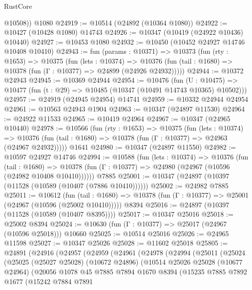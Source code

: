 \begin{lexlean}{RustCore}
\begin{coremodule}
        @10508))
    @1080
@24919 := @10514 (@24892 (@10364 @1080))
@24922 := @10427 (@10428 @1080) @14743
@24926 := @10347 (@10419 (@24922 @10436) @10440)
@24927 := @10453 @1080
@24932 := @10450 (@10452 @24927 @14746 @10408 @10410)
@24943 := fun (params : @10371) =>
  @10373
    (fun (rty : @1653) =>
    @10375
      (fun (lets : @10374) =>
      @10376 (fun (tail : @1680) => @10378 (fun (Γ : @10377) => @24899 (@24926 @24932)))))
@24944 := @10372 @24943
@24945 := @10369 @24944
@24954 := @10476
    (fun (U : @10475) => @10477 (fun (t : @29) => @10485 (@10347 (@10491 @14743 @10365) @10502)))
@24957 := @24919 (@24945 @24954) @14741
@24959 := @10332 @24944 @24954
@24961 := @10563 @24943 @1904
@24963 := @10347 (@24897 @11530)
@24964 := @24922 @11533
@24965 := @10419 @24964
@24967 := @10347 (@24965 @10440)
@24978 := @10566
    (fun (rty : @1653) =>
    @10375
      (fun (lets : @10374) =>
      @10376 (fun (tail : @1680) => @10378 (fun (Γ : @10377) => @24963 (@24967 @24932)))))
    @1641
@24980 := @10347 (@24897 @11550)
@24982 := @10597 @24927 @14746
@24994 := @10588
    (fun (lets : @10374) =>
    @10376
      (fun (tail : @1680) =>
      @10378 (fun (Γ : @10377) => @24980 (@24967 (@10596 (@24982 @10408 @10410))))))
    @7885
@25001 := @10347 (@24897 (@10397 (@11528 (@10589 (@10407 (@7886 @10410))))))
@25002 := @24982 @7885
@25011 := @10612
    (fun (tail : @1680) => @10378 (fun (Γ : @10377) => @25001 (@24967 (@10596 (@25002 @10410)))))
    @8394
@25016 := @24897 (@10397 (@11528 (@10589 (@10407 @8395))))
@25017 := @10347 @25016
@25018 := @25002 @8394
@25024 := @10630 (fun (Γ : @10377) => @25017 (@24967 (@10596 @25018))) @10660
@25025 := @10514 @25016
@25026 := @24965 @11598
@25027 := @10347 @25026
@25028 := @11602 @25018
@25805 := @24891
    (@24916
      (@24957
        (@24959
          (@24961
            (@24978
              (@24994
                (@25011
                  (@25024
                    (@25025
                      (@25027 @25028)
                      (@10672 @24896)
                      (@10514
                        @25026
                        @25028
                        (@10677 @24964)
                        (@20056
                          @1078
                          @45
                          @7885
                          @7894
                          @1670
                          @8394
                          (@15235
                            @7885
                            @7892
                            @1677
                            (@15242
                              @7884
                              @7891

\end{coremodule}
\end{lexlean}
